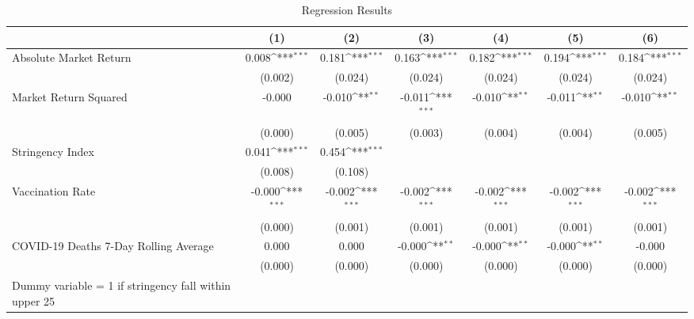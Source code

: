 \begin{table}[htbp]\centering
\def\sym#1{\ifmmode^{#1}\else\(^{#1}\)\fi}
\caption{Regression Results \label{reg1}}
\begin{tabular}{l*{6}{c}}
\toprule
                    &\multicolumn{1}{c}{(1)}         &\multicolumn{1}{c}{(2)}         &\multicolumn{1}{c}{(3)}         &\multicolumn{1}{c}{(4)}         &\multicolumn{1}{c}{(5)}         &\multicolumn{1}{c}{(6)}         \\
\midrule
Absolute Market Return&       0.008\sym{***}&       0.181\sym{***}&       0.163\sym{***}&       0.182\sym{***}&       0.194\sym{***}&       0.184\sym{***}\\
                    &     (0.002)         &     (0.024)         &     (0.024)         &     (0.024)         &     (0.024)         &     (0.024)         \\
\addlinespace
Market Return Squared&      -0.000         &      -0.010\sym{**} &      -0.011\sym{***}&      -0.010\sym{**} &      -0.011\sym{**} &      -0.010\sym{**} \\
                    &     (0.000)         &     (0.005)         &     (0.003)         &     (0.004)         &     (0.004)         &     (0.005)         \\
\addlinespace
Stringency Index    &       0.041\sym{***}&       0.454\sym{***}&                     &                     &                     &                     \\
                    &     (0.008)         &     (0.108)         &                     &                     &                     &                     \\
\addlinespace
Vaccination Rate    &      -0.000\sym{***}&      -0.002\sym{***}&      -0.002\sym{***}&      -0.002\sym{***}&      -0.002\sym{***}&      -0.002\sym{***}\\
                    &     (0.000)         &     (0.001)         &     (0.001)         &     (0.001)         &     (0.001)         &     (0.001)         \\
\addlinespace
COVID-19 Deaths 7-Day Rolling Average&       0.000         &       0.000         &      -0.000\sym{**} &      -0.000\sym{**} &      -0.000\sym{**} &      -0.000         \\
                    &     (0.000)         &     (0.000)         &     (0.000)         &     (0.000)         &     (0.000)         &     (0.000)         \\
\addlinespace
Dummy variable = 1 if stringency fall within upper 25%

\end{tabular}
\end{table}

